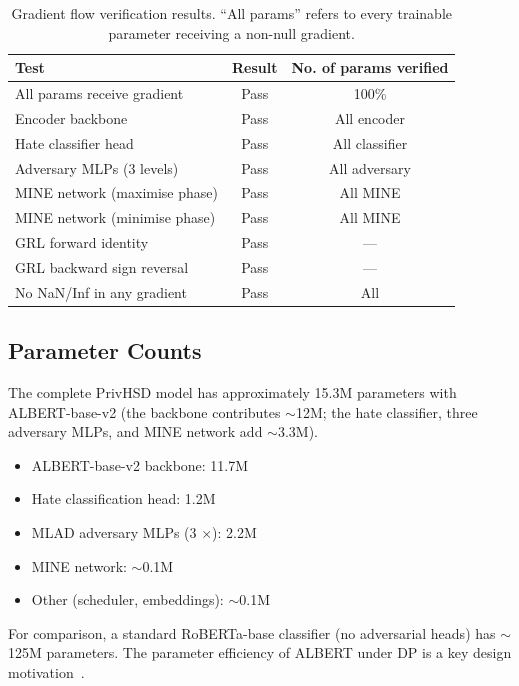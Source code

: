 \documentclass{article}
\begin{document}
\begin{table}[h]
  \centering
  \caption{Gradient flow verification results. ``All params'' refers to
           every trainable parameter receiving a non-null gradient.}
  \label{tab:gradients}
  \begin{tabular}{lcc}
    \toprule
    \textbf{Test} & \textbf{Result} & \textbf{No. of params verified} \\
    \midrule
    All params receive gradient & Pass & 100\% \\
    Encoder backbone & Pass & All encoder \\
    Hate classifier head & Pass & All classifier \\
    Adversary MLPs (3 levels) & Pass & All adversary \\
    MINE network (maximise phase) & Pass & All MINE \\
    MINE network (minimise phase) & Pass & All MINE \\
    GRL forward identity & Pass & --- \\
    GRL backward sign reversal & Pass & --- \\
    No NaN/Inf in any gradient & Pass & All \\
    \bottomrule
  \end{tabular}
\end{table}

\subsection{Parameter Counts}

The complete PrivHSD model has approximately 15.3M parameters with
ALBERT-base-v2 (the backbone contributes $\sim$12M; the hate classifier,
three adversary MLPs, and MINE network add $\sim$3.3M).
\begin{itemize}
  \item ALBERT-base-v2 backbone: 11.7M
  \item Hate classification head: 1.2M
  \item MLAD adversary MLPs (3 $\times$): 2.2M
  \item MINE network: $\sim$0.1M
  \item Other (scheduler, embeddings): $\sim$0.1M
\end{itemize}

For comparison, a standard RoBERTa-base classifier (no adversarial heads)
has $\sim$125M parameters. The parameter efficiency of ALBERT under DP
is a key design motivation~\cite{biy2025privacy}.
\end{document}
